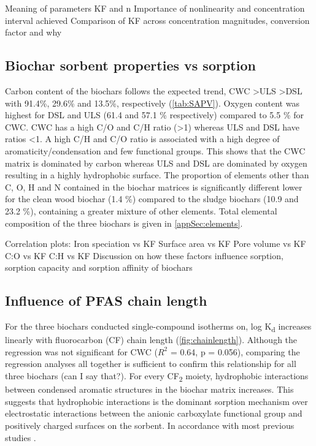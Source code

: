 Meaning of parameters KF and n
Importance of nonlinearity and concentration interval achieved 
Comparison of KF across concentration magnitudes, conversion factor and why

\subsection{Biochar sorbent properties vs sorption}
Carbon content of the biochars follows the expected trend, CWC \textgreater ULS \textgreater DSL with 91.4\%, 29.6\% and 13.5\%, respectively (\cref{tab:SAPV}). Oxygen content was highest for DSL and ULS (61.4 and 57.1 \% respectively) compared to 5.5 \% for CWC. CWC has a high C/O and C/H ratio (\textgreater 1) whereas ULS and DSL have ratios \textless 1. A high C/H and C/O ratio is associated with a high degree of aromaticity/condensation and few functional groups. This shows that the CWC matrix is dominated by carbon whereas ULS and DSL are dominated by oxygen resulting in a highly hydrophobic surface. The proportion of elements other than C, O, H and N contained in the biochar matrices is significantly different lower for the clean wood biochar (1.4 \%) compared to the sludge biochars (10.9 and 23.2 \%), containing a greater mixture of other elements. Total elemental composition of the three biochars is given in \cref{appSec:elements}.

Correlation plots:
    Iron speciation vs KF
    Surface area vs KF 
    Pore volume vs KF 
    C:O vs KF 
    C:H vs KF  
Discussion on how these factors influence sorption, sorption capacity and sorption affinity of biochars

\subsection{Influence of PFAS chain length}
For the three biochars conducted single-compound isotherms on, log K\textsubscript{d} increases linearly with fluorocarbon (CF) chain length (\cref{fig:chainlength}). Although the regression was not significant for CWC ($R^2$ = 0.64, p = 0.056), comparing the regression analyses all together is sufficient to confirm this relationship for all three biochars (can I say that?). For every CF\textsubscript{2} moiety, hydrophobic interactions between condensed aromatic structures in the biochar matrix increases. This suggests that hydrophobic interactions is the dominant sorption mechanism over electrostatic interactions between the anionic carboxylate functional group and positively charged surfaces on the sorbent. In accordance with most previous studies \citep{Sorengard2019,higgins2006sorption}. 

